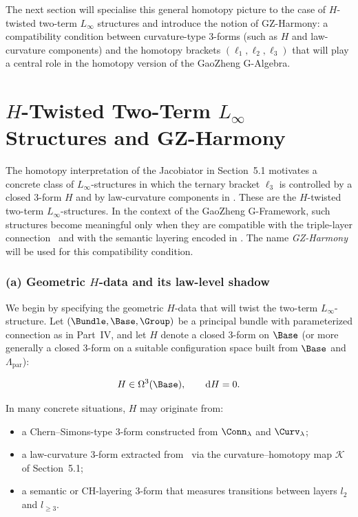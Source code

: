 \documentclass[11pt]{book}
\theoremstyle{plain}
\theoremstyle{definition}
\begin{document}
The next section will specialise this general homotopy picture to the
case of $H$-twisted two-term $L_\infty$ structures and introduce the
notion of GZ-Harmony: a compatibility condition between curvature-type
3-forms (such as $H$ and law-curvature components) and the homotopy
brackets $(\ell_1,\ell_2,\ell_3)$ that will play a central role in the
homotopy version of the GaoZheng G-Algebra.



\section[H-Twisted Two-Term L-infinity Structures and GZ-Harmony]{\texorpdfstring{$H$}{H}-Twisted Two-Term $L_\infty$ Structures and GZ-Harmony}


The homotopy interpretation of the Jacobiator in Section~5.1 motivates
a concrete class of $L_\infty$-structures in which the ternary bracket
$\ell_3$ is controlled by a closed 3-form $H$ and by law-curvature
components in \GZLCurv. These are the $H$-twisted two-term
$L_\infty$-structures. In the context of the GaoZheng G-Framework, such
structures become meaningful only when they are compatible with the
triple-layer connection \GZTLC\ and with the semantic layering encoded
in \GZGMS. The name \emph{GZ-Harmony} will be used for this compatibility
condition.



\subsubsection*{(a) Geometric $H$-data and its law-level shadow}

We begin by specifying the geometric $H$-data that will twist the
two-term $L_\infty$-structure. Let $(\Bundle,\Base,\Group)$ be a
principal bundle with parameterized connection as in Part~IV, and let
$H$ denote a closed 3-form on $\Base$ (or more generally a closed
3-form on a suitable configuration space built from $\Base$ and
$\Lambda_{\mathrm{par}}$):

\[
   H \in \Omega^3(\Base),
   \qquad
   \mathrm{d}H = 0.
\]

In many concrete situations, $H$ may originate from:

\begin{itemize}
  \item a Chern–Simons-type 3-form constructed from $\Conn_\lambda$ and
        $\Curv_\lambda$;
  \item a law-curvature 3-form extracted from \GZLCurv\ via the
        curvature–homotopy map $\mathcal{K}$ of Section~5.1;
  \item a semantic or CH-layering 3-form that measures transitions
        between layers $l_2$ and $l_{\ge3}$.
\end{itemize}
\end{document}
